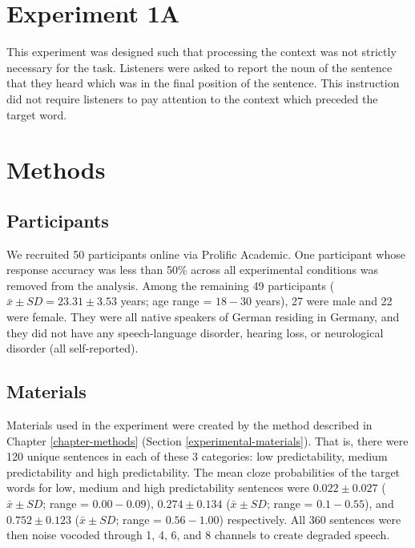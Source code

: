 \documentclass[a4paper, nobind]{templates/ociamthesis}
\begin{document}
\hypertarget{experiment1a}{%
\section{Experiment 1A}\label{experiment1a}}

This experiment was designed such that processing the context was not strictly necessary for the task.
Listeners were asked to report the noun of the sentence that they heard which was in the final position of the sentence.
This instruction did not require listeners to pay attention to the context which preceded the target word.

\hypertarget{methods}{%
\section{Methods}\label{methods}}

\hypertarget{participants}{%
\subsection{Participants}\label{participants}}

We recruited 50 participants online via Prolific Academic.
One participant whose response accuracy was less than 50\% across all experimental conditions was removed from the analysis.
Among the remaining 49 participants (\(\bar{x}\pm SD=23.31\pm 3.53\) years; age range = \(18-30\) years), 27 were male and 22 were female.
They were all native speakers of German residing in Germany, and they did not have any speech-language disorder, hearing loss, or neurological disorder (all self-reported).

\hypertarget{materials}{%
\subsection{Materials}\label{materials}}

Materials used in the experiment were created by the method described in Chapter \ref{chapter-methods} (Section \ref{experimental-materials}).
That is, there were 120 unique sentences in each of these 3 categories: low predictability, medium predictability and high predictability.
The mean cloze probabilities of the target words for low, medium and high predictability sentences were \(0.022\pm0.027\) (\(\bar{x}\pm SD\); range = \(0.00-0.09\)), \(0.274\pm0.134\) (\(\bar{x}\pm SD\); range = \(0.1-0.55\)), and \(0.752\pm0.123\) (\(\bar{x}\pm SD\); range = \(0.56-1.00\)) respectively.
All 360 sentences were then noise vocoded through 1, 4, 6, and 8 channels to create degraded speech.
\end{document}
